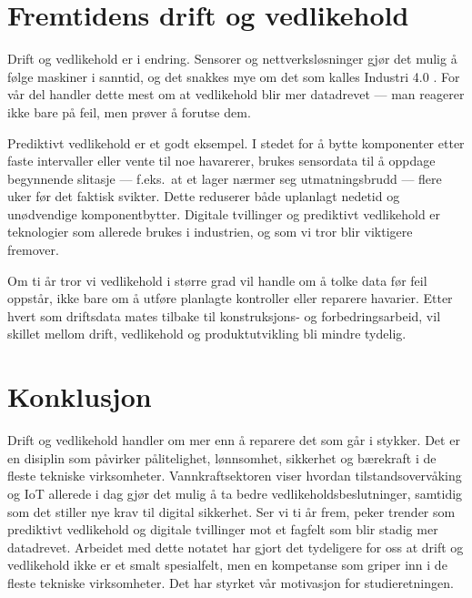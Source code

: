 \section*{Fremtidens drift og vedlikehold}

Drift og vedlikehold er i endring. Sensorer og nettverksløsninger gjør det mulig å følge maskiner i sanntid, og det snakkes mye om det som kalles Industri 4.0 \parencite{schwab2016}. For vår del handler dette mest om at vedlikehold blir mer datadrevet — man reagerer ikke bare på feil, men prøver å forutse dem.

Prediktivt vedlikehold er et godt eksempel. I stedet for å bytte komponenter etter faste intervaller eller vente til noe havarerer, brukes sensordata til å oppdage begynnende slitasje — f.eks.\ at et lager nærmer seg utmatningsbrudd — flere uker før det faktisk svikter. Dette reduserer både uplanlagt nedetid og unødvendige komponentbytter. Digitale tvillinger og prediktivt vedlikehold er teknologier som allerede brukes i industrien, og som vi tror blir viktigere fremover.

Om ti år tror vi vedlikehold i større grad vil handle om å tolke data før feil oppstår, ikke bare om å utføre planlagte kontroller eller reparere havarier. Etter hvert som driftsdata mates tilbake til konstruksjons- og forbedringsarbeid, vil skillet mellom drift, vedlikehold og produktutvikling bli mindre tydelig.

\section*{Konklusjon}
Drift og vedlikehold handler om mer enn å reparere det som går i stykker. Det er en disiplin som påvirker pålitelighet, lønnsomhet, sikkerhet og bærekraft i de fleste tekniske virksomheter. Vannkraftsektoren viser hvordan tilstandsovervåking og IoT allerede i dag gjør det mulig å ta bedre vedlikeholdsbeslutninger, samtidig som det stiller nye krav til digital sikkerhet. Ser vi ti år frem, peker trender som prediktivt vedlikehold og digitale tvillinger mot et fagfelt som blir stadig mer datadrevet. Arbeidet med dette notatet har gjort det tydeligere for oss at drift og vedlikehold ikke er et smalt spesialfelt, men en kompetanse som griper inn i de fleste tekniske virksomheter. Det har styrket vår motivasjon for studieretningen.
